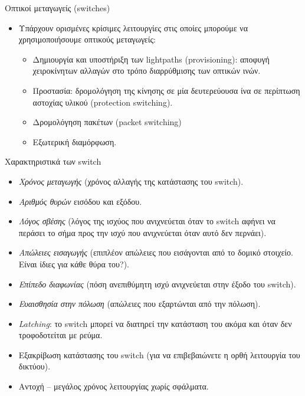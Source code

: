 \documentclass[11pt,aspectratio=169]{beamer}
\begin{document}
\begin{frame}[t]{Οπτικοί μεταγωγείς (switches)}
\begin{itemize}
\item Υπάρχουν ορισμένες κρίσιμες λειτουργίες στις οποίες μπορούμε να χρησιμοποιήσουμε οπτικούς μεταγωγείς:
\begin{itemize}
\item Δημιουργία και υποστήριξη των lightpaths (provisioning): αποφυγή χειροκίνητων αλλαγών στο τρόπο διαρρύθμισης των οπτικών ινών.
\item Προστασία: δρομολόγηση της κίνησης σε μία δευτερεύουσα ίνα σε περίπτωση αστοχίας υλικού (protection switching).
\item Δρομολόγηση πακέτων (packet switching)
\item Εξωτερική διαμόρφωση.
\end{itemize}
\end{itemize}
\end{frame}

\begin{frame}[shrink=20,t]{Χαρακτηριστικά των switch}
\begin{itemize}
\item \textit{Χρόνος μεταγωγής} (χρόνος αλλαγής της κατάστασης του switch).
\item \textit{Αριθμός θυρών} εισόδου και εξόδου.
\item \textit{Λόγος σβέσης} (λόγος της ισχύος που ανιχνεύεται όταν το switch αφήνει να περάσει το σήμα προς την ισχύ που ανιχνεύεται όταν αυτό δεν περνάει).
\item \textit{Απώλειες εισαγωγής} (επιπλέον απώλειες που εισάγονται από το δομικό στοιχείο. Είναι ίδιες για κάθε θύρα του?).
\item \textit{Επίπεδο διαφωνίας} (πόση ανεπιθύμητη ισχύ ανιχνεύεται στην έξοδο του switch).
\item \textit{Ευαισθησία στην πόλωση }(απώλειες που εξαρτώνται από την πόλωση).
\item \textit{Latching}: το switch μπορεί να διατηρεί την κατάσταση του ακόμα και όταν δεν τροφοδοτείται με ρεύμα.
\item Εξακρίβωση κατάστασης του switch (για να επιβεβαιώνετε η ορθή λειτουργία του δικτύου).
\item Αντοχή – μεγάλος χρόνος λειτουργίας χωρίς σφάλματα.
\end{itemize}
\end{frame}
\end{document}
